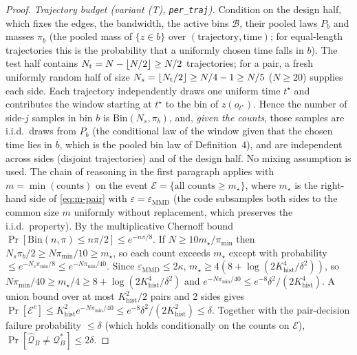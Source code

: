 \documentclass[10pt]{article}
\newcommand{\calQ}{\mathcal{Q}}
\newcommand{\calB}{\mathcal{B}}
\newcommand{\epsMMD}{\varepsilon_{\mathrm{MMD}}}
\newcommand{\Qstar}{\mathcal{Q}^*}
\newcommand{\Khist}{K_{\mathrm{hist}}}
\begin{document}
\begin{proof}
\emph{Trajectory budget (variant (T), \texttt{per\_traj}).}  Condition on the
design half, which fixes the edges, the bandwidth, the active bins $\calB$,
their pooled laws $P_b$ and masses $\pi_b$ (the pooled mass of $\{z\in b\}$ over
$(\text{trajectory},\text{time})$; for equal-length trajectories this is the
probability that a uniformly chosen time falls in $b$).  The test half
contains $N_{\rm t}=N-\lfloor N/2\rfloor\ge N/2$ trajectories; for a pair, a
fresh uniformly random half of size $N_s=\lfloor N_{\rm t}/2\rfloor\ge N/4-1\ge
N/5$ ($N\ge20$) supplies each side.  Each trajectory independently draws one
uniform time $t^\star$ and contributes the window starting at $t^\star$ to the
bin of $z(o_{t^\star})$.  Hence the number of side-$j$ samples in bin $b$ is
$\mathrm{Bin}(N_s,\pi_b)$, and, \emph{given the counts}, those samples are
i.i.d.\ draws from $P_b$ (the conditional law of the window given that the
chosen time lies in $b$, which is the pooled bin law of Definition~4), and are
independent across sides (disjoint trajectories) and of the design half.  No
mixing assumption is used.  The chain of reasoning in the first paragraph
applies with $m=\min(\text{counts})$ on the event
$\mathcal E=\{\text{all counts}\ge m_\star\}$, where $m_\star$ is the right-hand
side of \eqref{eq:m-pair} with $\varepsilon=\epsMMD$ (the code subsamples both
sides to the common size $m$ uniformly without replacement, which preserves the
i.i.d.\ property).  By the multiplicative Chernoff bound
$\Pr[\mathrm{Bin}(n,\pi)\le n\pi/2]\le e^{-n\pi/8}$.  If $N\ge10m_\star/\pi_{\min}$ then
$N_s\pi_b/2\ge N\pi_{\min}/10\ge m_\star$, so each count exceeds $m_\star$ except with
probability $\le e^{-N_s\pi_{\min}/8}\le e^{-N\pi_{\min}/40}$.  Since
$\epsMMD\le2\kappa$, $m_\star\ge4(8+\log(2\Khist^4/\delta^2))$, so
$N\pi_{\min}/40\ge m_\star/4\ge8+\log(2\Khist^4/\delta^2)$ and
$e^{-N\pi_{\min}/40}\le e^{-8}\delta^2/(2\Khist^4)$.  A union bound over at most
$\Khist^2/2$ pairs and 2 sides gives $\Pr[\mathcal E^c]\le\Khist^2
e^{-N\pi_{\min}/40}\le e^{-8}\delta^2/(2\Khist^2)\le\delta$.  Together with the
pair-decision failure probability $\le\delta$ (which holds conditionally on the
counts on $\mathcal E$), $\Pr[\widehat{\calQ}_B\ne\Qstar_B]\le2\delta$.


\end{proof}
\end{document}
